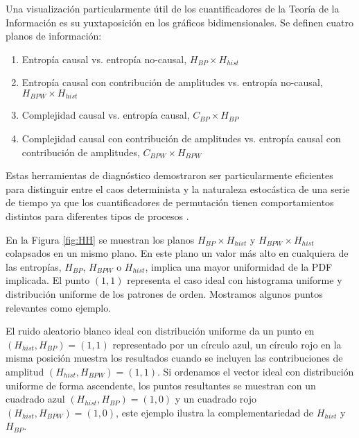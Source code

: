 Una visualización particularmente útil de los cuantificadores de la Teoría de la Información es su yuxtaposición en los gráficos bidimensionales.
Se definen cuatro planos de información:
\begin{enumerate}
	\item Entropía causal vs. entropía no-causal, $H_{BP} \times H_{hist}$
	\item Entropía causal con contribución de amplitudes vs. entropía no-causal, $H_{BPW} \times H_{hist}$
	\item Complejidad causal vs. entropía causal, $C_{BP} \times H_{BP}$
	\item Complejidad causal con contribución de amplitudes vs. entropía causal con contribución de amplitudes, $C_{BPW} \times H_{BPW}$
\end{enumerate}

Estas herramientas de diagnóstico demostraron ser particularmente eficientes para distinguir entre el caos determinista y la naturaleza estocástica de una serie de tiempo ya que los cuantificadores de permutación tienen comportamientos distintos para diferentes tipos de procesos \cite{DeMicco2009, Rosso2007, Fouda2017, DeMicco2008, DeMicco2012, Rosso2010, Antonelli2017}.

En la Figura \ref{fig:HH} se muestran los planos $H_{BP} \times H_{hist}$ y $H_{BPW} \times H_{hist}$ colapsados en un mismo plano.
En este plano un valor más alto en cualquiera de las entropías, $H_{BP}$, $H_{BPW}$ o $H_{hist}$, implica una mayor uniformidad de la PDF implicada.
El punto $(1, 1)$ representa el caso ideal con histograma uniforme y distribución uniforme de los patrones de orden.
Mostramos algunos puntos relevantes como ejemplo.

El ruido aleatorio blanco ideal con distribución uniforme da un punto en $(H_{hist}, H_{BP}) = (1, 1)$ representado por un círculo azul, un círculo rojo en la misma posición muestra los resultados cuando se incluyen las contribuciones de amplitud $(H_{hist}, H_{BPW}) = (1, 1)$.
Si ordenamos el vector ideal con distribución uniforme de forma ascendente, los puntos resultantes se muestran con un cuadrado azul $(H_{hist}, H_{BP}) = (1, 0)$ y un cuadrado rojo $(H_{hist}, H_{BPW}) = (1, 0)$, este ejemplo ilustra la complementariedad de $H_{hist}$ y $H_{BP}$.

